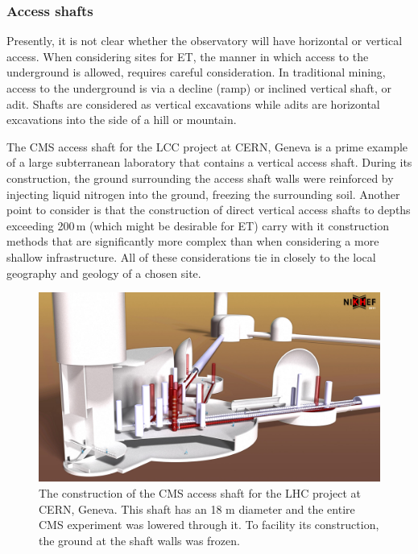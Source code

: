 
\FloatBarrier
\subsubsection{Access shafts}
Presently, it is not clear whether the observatory will have horizontal or vertical access. When considering sites for ET, the manner in which access to the underground is allowed, requires careful consideration. In traditional mining, access to the underground is via a decline (ramp) or inclined vertical shaft, or adit. Shafts are considered as vertical excavations while adits are horizontal excavations into the side of a hill or mountain. 

The CMS access shaft for the LCC project at CERN, Geneva is a prime example of a large subterranean laboratory that contains a vertical access shaft. During its construction, the ground surrounding the access shaft walls were reinforced by injecting liquid nitrogen into the ground, freezing the surrounding soil. Another point to consider is that the construction of direct vertical access shafts to depths exceeding 200\,m (which might be desirable for ET) carry with it construction methods that are significantly more complex than when considering a more shallow infrastructure. All of these considerations tie in closely to the local geography and geology of a chosen site.
\begin{figure}[htbp!]
	\centering
		\includegraphics[width=17cm]{./Sec_SiteInfra/Figures/ShaftAccess.jpg}
		\caption{The construction of the CMS access shaft for the LHC project at CERN, Geneva. This shaft has an 18 m diameter and the entire CMS experiment was lowered through it. To facility its construction, the ground at the shaft walls was frozen.}
	\label{shaftaccess}
\end{figure}

